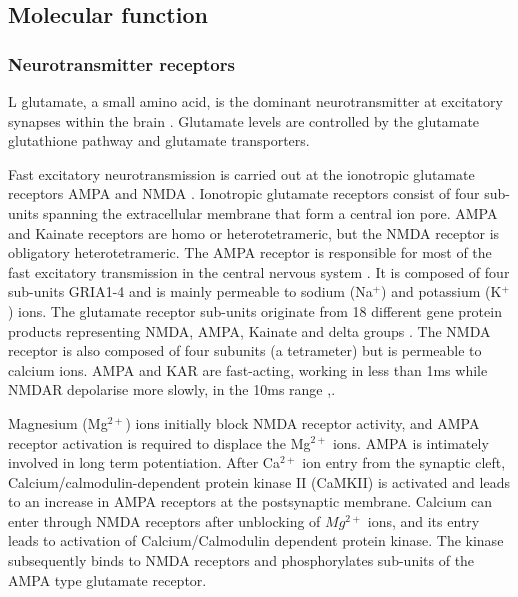 
\subsection{Molecular function}

\subsubsection{Neurotransmitter receptors}
\label{sec:Neurotransmitter receptors}
L glutamate, a small amino acid, is the dominant neurotransmitter at excitatory synapses within the brain \cite{niswender2010metabotropic}. Glutamate levels are controlled by the glutamate glutathione pathway and glutamate transporters\cite{sedlak2019glutathione}.

Fast excitatory neurotransmission is carried out at the ionotropic glutamate receptors AMPA and NMDA \cite{traynelis2010glutamate}. Ionotropic glutamate receptors consist of four sub-units spanning the extracellular membrane that form a central ion pore. AMPA and Kainate receptors are homo or heterotetrameric, but the NMDA receptor is obligatory heterotetrameric. The AMPA receptor is responsible for most of the fast excitatory transmission in the central nervous system \cite{henley2013ampa}. It is composed of four sub-units GRIA1-4 and is mainly permeable to sodium (Na$^+$) and potassium (K$^+$) ions. The glutamate receptor sub-units originate from 18 different gene protein products representing NMDA, AMPA, Kainate and delta groups \cite{traynelis2010glutamate}. The NMDA receptor is also composed of four subunits (a tetrameter)  but is permeable to calcium ions. AMPA and KAR are fast-acting, working in less than 1ms\cite{traynelis2010glutamate} while NMDAR depolarise more slowly, in the 10ms range \cite{traynelis2010glutamate},\cite{nicoll2017brief}. 

Magnesium (Mg$^{2+}$) ions initially block NMDA receptor activity, and  AMPA receptor activation is required to displace the Mg$^{2+}$ ions. AMPA is intimately involved in long term potentiation. After Ca$^{2+}$ ion entry from the synaptic cleft, Calcium/calmodulin-dependent protein kinase II (CaMKII) is activated and leads to an increase in AMPA receptors at the postsynaptic membrane. Calcium can enter through NMDA receptors after unblocking of $Mg^{2+}$ ions, and its entry leads to activation of Calcium/Calmodulin dependent protein kinase. The kinase subsequently binds to NMDA receptors and phosphorylates sub-units of the AMPA type glutamate receptor.

